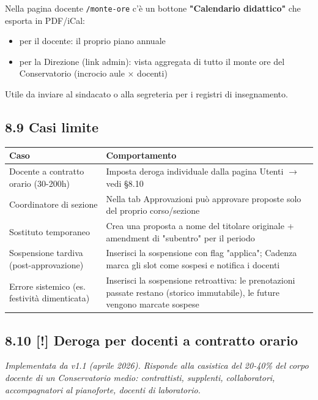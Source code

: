 \documentclass[11pt,a4paper]{article}
\renewenvironment{quote}
  {\begin{list}{}{%
      \setlength{\leftmargin}{8pt}%
      \setlength{\rightmargin}{8pt}%
      \setlength{\topsep}{6pt}%
      \setlength{\parsep}{0pt}}%
      \item\relax\color{black!75}\itshape}
  {\end{list}}
\begin{document}
Nella pagina docente \texttt{/monte-ore} c'è un bottone \textbf{"Calendario didattico"} che esporta in PDF/iCal:

\begin{itemize}
  \item per il docente: il proprio piano annuale
  \item per la Direzione (link admin): vista aggregata di tutto il monte ore del Conservatorio (incrocio aule × docenti)
\end{itemize}

Utile da inviare al sindacato o alla segreteria per i registri di insegnamento.

\subsection{8.9 Casi limite}


\begin{table}[H]
\centering
\small
\begin{tabularx}{\linewidth}{|X|X|}
\hline
\rowcolor{tableheader} Caso & Comportamento \\
\hline
Docente a contratto orario (30-200h) & Imposta deroga individuale dalla pagina Utenti $\rightarrow$ vedi §8.10 \\
\hline
Coordinatore di sezione & Nella tab Approvazioni può approvare proposte solo del proprio corso/sezione \\
\hline
Sostituto temporaneo & Crea una proposta a nome del titolare originale + amendment di "subentro" per il periodo \\
\hline
Sospensione tardiva (post-approvazione) & Inserisci la sospensione con flag "applica"; Cadenza marca gli slot come sospesi e notifica i docenti \\
\hline
Errore sistemico (es. festività dimenticata) & Inserisci la sospensione retroattiva: le prenotazioni passate restano (storico immutabile), le future vengono marcate sospese \\
\hline
\end{tabularx}
\end{table}


\subsection{8.10 \textbf{[!]} Deroga per docenti a contratto orario}


\begin{quote}
Implementata da v1.1 (aprile 2026). Risponde alla casistica del 20-40\% del corpo docente di un Conservatorio medio: contrattisti, supplenti, collaboratori, accompagnatori al pianoforte, docenti di laboratorio.
\end{quote}
\end{document}
